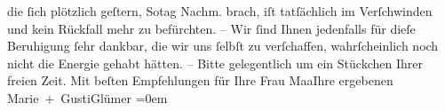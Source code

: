 \begin{ledgroupsized}[t]{13cm}
               die {\pb}ſich plötzlich geſtern, So{\geminationn}tag{ }Nachm. brach, iſt tatſächlich im Verſchwinden und kein Rückfall mehr zu befürchten. – Wir ſind Ihnen
               jedenfalls für dieſe Beruhigung ſehr dankbar, die wir uns ſelbſt zu verſchaffen, {\pb}wahrſcheinlich noch nicht die Energie gehabt hätten.
               – Bitte gelegentlich um ein Stückchen Ihrer freien Zeit.\pend
           \pstart
           Mit beſten Empfehlungen für Ihre Frau Ma{\geminationm}aIhre ergebenen {\\[\baselineskip]}\spacefill\mbox{Marie + GustiGlümer}\pend
           \leftskip=0em{}
         
         \endnumbering{}\end{ledgroupsized}  \newcommand{\dateiname}{L03056}\newcommand{\titel}{Paul Goldmann an Arthur Schnitzler, 29. 1. [1901]}\newcommand{\editorInnen}{Martin Anton Müller und Laura Untner}
      